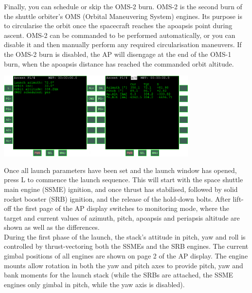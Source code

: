 Finally, you can schedule or skip the OMS-2 burn. OMS-2 is the second burn of the shuttle orbiter’s OMS (Orbital Maneuvering System) engines. Its purpose is to circularise the orbit once the spacecraft reaches the apoapsis point during ascent. OMS-2 can be commanded to be performed automatically, or you can disable it and then manually perform any required circularisation maneuvers. If the OMS-2 burn is disabled, the AP will disengage at the end of the OMS-1 burn, when the apoapsis distance has reached the commanded orbit altitude.\\ 

\begin{center}
\includegraphics[width=0.75\textwidth]{Images//Pic4.png}
\end{center}

Once all launch parameters have been set and the launch window has opened, press L to commence the launch sequence. This will start with the space shuttle main engine (SSME) ignition, and once thrust has stabilised, followed by solid rocket booster (SRB) ignition, and the release of the hold-down bolts.
After lift-off the first page of the AP display switches to monitoring mode, where the target and current values of azimuth, pitch, apoapsis and periapsis altitude are shown as well as the differences.\\

During the first phase of the launch, the stack’s attitude in pitch, yaw and roll is controlled by thrust-vectoring both the SSMEs and the SRB engines. The current gimbal positions of all engines are shown on page 2 of the AP display. The engine mounts allow rotation in both the yaw and pitch axes to provide pitch, yaw and bank moments for the launch stack (while the SRBs are attached, the SSME engines only gimbal in pitch, while the yaw axis is disabled).\\

